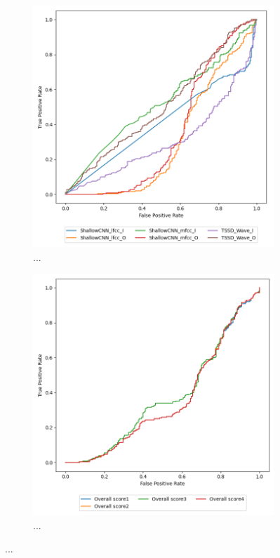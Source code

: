 \begin{figure}[H]
    \begin{subfigure}[h]{0.5\linewidth}
        \centering
        \includegraphics[width=1\linewidth]{other-fig/tests/asv_methods.png}
        \caption{...}
    \end{subfigure}
    \hfill
    \begin{subfigure}[h]{0.5\linewidth}
        \centering
        \includegraphics[width=1\linewidth]{other-fig/tests/asv_overall_score.png}
        \caption{...}
    \end{subfigure}
    \caption{...}
\end{figure}

